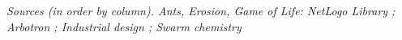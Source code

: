 \documentclass[english,11pt]{beamer}
\begin{document}
{\begin{columns}
\end{columns}


\justify

\footnotesize\textit{Sources (in order by column). Ants, Erosion, Game of Life: NetLogo Library ; Arbotron \cite{jun2005formation}; Industrial design \cite{Aage:2017aa}; Swarm chemistry \cite{sayama2007decentralized}}

}
\end{document}

